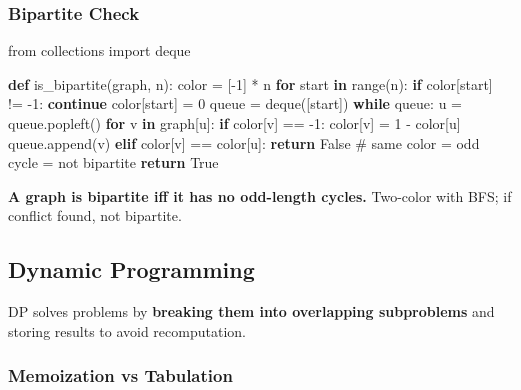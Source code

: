 \documentclass[11pt]{article}
\newenvironment{Shaded}{\begin{snugshade}}{\end{snugshade}}
\newcommand{\BuiltInTok}[1]{\textcolor[rgb]{0.50,0.55,0.55}{#1}}
\newcommand{\CommentTok}[1]{\textcolor[rgb]{0.48,0.49,0.49}{#1}}
\newcommand{\ControlFlowTok}[1]{\textcolor[rgb]{0.99,0.74,0.29}{\textbf{#1}}}
\newcommand{\DecValTok}[1]{\textcolor[rgb]{0.96,0.45,0.00}{#1}}
\newcommand{\ImportTok}[1]{\textcolor[rgb]{0.15,0.68,0.38}{#1}}
\newcommand{\KeywordTok}[1]{\textcolor[rgb]{0.81,0.81,0.76}{\textbf{#1}}}
\newcommand{\NormalTok}[1]{\textcolor[rgb]{0.81,0.81,0.76}{#1}}
\newcommand{\OperatorTok}[1]{\textcolor[rgb]{0.81,0.81,0.76}{#1}}
\newcommand{\VariableTok}[1]{\textcolor[rgb]{0.15,0.68,0.68}{#1}}
\begin{document}
\subsubsection{Bipartite Check}\label{bipartite-check}


\begin{Shaded}
\begin{Highlighting}[]
\ImportTok{from}\NormalTok{ collections }\ImportTok{import}\NormalTok{ deque}

\KeywordTok{def}\NormalTok{ is\_bipartite(graph, n):}
\NormalTok{    color }\OperatorTok{=}\NormalTok{ [}\OperatorTok{{-}}\DecValTok{1}\NormalTok{] }\OperatorTok{*}\NormalTok{ n}
    \ControlFlowTok{for}\NormalTok{ start }\KeywordTok{in} \BuiltInTok{range}\NormalTok{(n):}
        \ControlFlowTok{if}\NormalTok{ color[start] }\OperatorTok{!=} \OperatorTok{{-}}\DecValTok{1}\NormalTok{: }\ControlFlowTok{continue}
\NormalTok{        color[start] }\OperatorTok{=} \DecValTok{0}
\NormalTok{        queue }\OperatorTok{=}\NormalTok{ deque([start])}
        \ControlFlowTok{while}\NormalTok{ queue:}
\NormalTok{            u }\OperatorTok{=}\NormalTok{ queue.popleft()}
            \ControlFlowTok{for}\NormalTok{ v }\KeywordTok{in}\NormalTok{ graph[u]:}
                \ControlFlowTok{if}\NormalTok{ color[v] }\OperatorTok{==} \OperatorTok{{-}}\DecValTok{1}\NormalTok{:}
\NormalTok{                    color[v] }\OperatorTok{=} \DecValTok{1} \OperatorTok{{-}}\NormalTok{ color[u]}
\NormalTok{                    queue.append(v)}
                \ControlFlowTok{elif}\NormalTok{ color[v] }\OperatorTok{==}\NormalTok{ color[u]:}
                    \ControlFlowTok{return} \VariableTok{False}    \CommentTok{\# same color = odd cycle = not bipartite}
    \ControlFlowTok{return} \VariableTok{True}
\end{Highlighting}
\end{Shaded}

\textbf{A graph is bipartite iff it has no odd-length cycles.} Two-color with BFS; if conflict found, not bipartite.

\subsection{Dynamic Programming}\label{dynamic-programming}

DP solves problems by \textbf{breaking them into overlapping subproblems} and storing results to avoid recomputation.

\subsubsection{Memoization vs Tabulation}\label{memoization-vs-tabulation}
\end{document}
